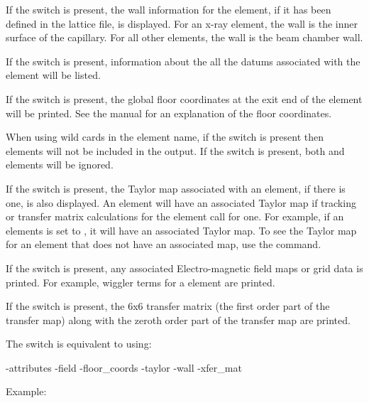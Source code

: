 {{{{{{{{If the  switch is present, the wall information for the element, if it has been
defined in the lattice file, is displayed. For an x-ray  element, the wall
is the inner surface of the capillary. For all other elements, the wall is the beam
chamber wall.

If the  switch is present, information about the all the datums associated with
the element will be listed.

If the  switch is present, the global floor coordinates at the exit end
of the element will be printed. See the \bmad manual for an explanation of the floor
coordinates.

When using wild cards in the element name, if the  switch is present then
 elements will not be included in the output. If the  switch is
present, both  and  elements will be ignored.

If the  switch is present, the Taylor map associated with an element, if there
is one, is also displayed. An element will have an associated Taylor map if tracking or
transfer matrix calculations for the element call for one. For example, if an elements
 is set to , it will have an associated Taylor map. To see
the Taylor map for an element that does not have an associated map, use the  command.

If the  switch is present, any associated Electro-magnetic field maps or grid
data is printed. For example, wiggler terms for a   element are
printed.

If the  switch is present, the 6x6 transfer matrix (the first order part of
the transfer map) along with the zeroth order part of the transfer map are printed.

The  switch is equivalent to using:
\begin{example}
  -attributes
  -field
  -floor_coords
  -taylor
  -wall
  -xfer_mat
\end{example}

Example:

}}}}}}}}
